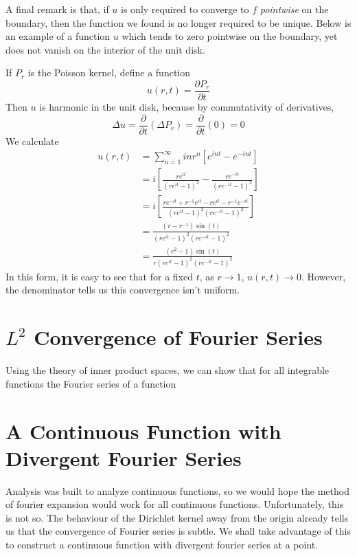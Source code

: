 A final remark is that, if $u$ is only required to converge to $f$ {\it pointwise} on the boundary, then the function we found is no longer required to be unique. Below is an example of a function $u$ which tends to zero pointwise on the boundary, yet does not vanish on the interior of the unit disk.

\begin{example}
    If $P_r$ is the Poisson kernel, define a function
    \[ u(r,t) = \frac{\partial P_r}{\partial t} \]
    Then $u$ is harmonic in the unit disk, because by commutativity of derivatives,
    \[ \Delta u = \frac{\partial}{\partial t}(\Delta P_r) = \frac{\partial}{\partial t}(0) = 0 \]
    We calculate
    \begin{align*}
        u(r,t) &= \sum_{n = 1}^\infty in r^n [e^{int} - e^{-int}]\\
        &= i \left[ \frac{r e^{it}}{(re^{it} - 1)^2} - \frac{r e^{-it}}{(re^{-it} - 1)^2} \right]\\
        &= i \left[ \frac{re^{-it} + r^{-1}e^{it} - re^{it} - r^{-1}e^{-it}}{(re^{it} - 1)^2(re^{-it} - 1)^2} \right]\\
        &= \frac{(r - r^{-1}) \sin(t)}{(re^{it} - 1)^2(re^{-it} - 1)^2}\\
        &= \frac{(r^2 - 1) \sin(t)}{r (re^{it} - 1)^2(re^{-it} - 1)^2}
    \end{align*}
    In this form, it is easy to see that for a fixed $t$, as $r \to 1$, $u(r,t) \to 0$. However, the denominator tells us this convergence isn't uniform.
\end{example}

\section{$L^2$ Convergence of Fourier Series}

Using the theory of inner product spaces, we can show that for all integrable functions the Fourier series of a function

\section{A Continuous Function with Divergent Fourier Series}

Analysis was built to analyze continuous functions, so we would hope the method of fourier expansion would work for all continuous functions. Unfortunately, this is not so. The behaviour of the Dirichlet kernel away from the origin already tells us that the convergence of Fourier series is subtle. We shall take advantage of this to construct a continuous function with divergent fourier series at a point.

